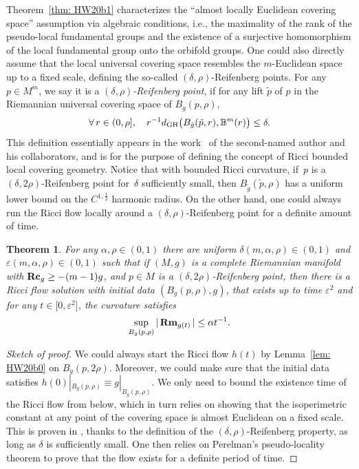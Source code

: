 \documentclass[10pt,a4paper]{amsart}
\numberwithin{equation}{section}
\newtheorem{Theorem}{Theorem}[section]
\newcommand{\Rm}{\operatorname{\bf Rm}}
\newcommand{\Rc}{\operatorname{\bf Rc}}
\begin{document}
Theorem~\ref{thm: HW20b1} characterizes the ``almost locally Euclidean
covering space'' assumption via algebraic conditions, i.e., the maximality of
the rank of the pseudo-local fundamental groups and the existence of a
surjective homomorphism of the local fundamental group onto the orbifold
groups. One could also directly assume that the local universal covering space
resembles the $m$-Euclidean space up to a fixed scale, defining the so-called
$(\delta,\rho)$-Reifenberg points. For any $p\in M^m$, we say it is a
$(\delta,\rho)$\emph{-Reifenberg point}, if for any lift $\tilde{p}$ of $p$ in
the Riemannian universal covering space of $B_g(p,\rho)$,
\begin{align*}
\forall\, r\in (0,\rho],\quad r^{-1}d_{\rm GH} \big(B_{\tilde{g}}(\tilde{p},r),
\mathbb{B}^m(r) \big) \le \delta.
\end{align*}
This definition essentially appears in the work~\cite{HKRX18} of the
second-named author and his collaborators, and is for the purpose of defining
the concept of Ricci bounded local covering geometry. Notice that with bounded
Ricci curvature, if~$p$ is a~$(\delta,2\rho)$-Reifenberg point for~$\delta$
sufficiently small, then $B_{\tilde{g}}(\tilde{p},\rho)$ has a uniform lower
bound on the $C^{1,\frac{1}{2}}$ harmonic radius. On the other hand, one could
always run the Ricci flow locally around a $(\delta,\rho)$-Reifenberg point for
a definite amount of time.
\begin{Theorem}\label{thm: HKRX18b}
For any $\alpha,\rho \in (0,1)$ there are uniform $\delta(m,\alpha,\rho) \in
(0,1)$ and $\varepsilon(m,\alpha,\rho)\in (0,1)$ such that if $(M,g)$ is a
complete Riemannian manifold with $\Rc_g\ge-(m-1)g$, and $p\in M$ is a
$(\delta,2\rho)$-Reifenberg point, then there is a Ricci flow solution with
initial data $(B_g(p,\rho),g)$, that exists up to time $\varepsilon^2$
and for any $t\in \big[0,\varepsilon^2\big]$, the curvature satisfies
\begin{align*}
\sup_{B_g(p,\rho)} |\Rm_{g(t)} | \le \alpha t^{-1}.
\end{align*}
\end{Theorem}
\begin{proof}[Sketch of proof]
We could always start the Ricci flow $h(t)$ by Lemma~\ref{lem: HW20b0} on
$B_g(p,2\rho)$. Moreover, we could make sure that the initial data satisfies
$h(0)|_{B_g(p,\rho)}\equiv g|_{B_g(p,\rho)}$. We only need to bound the
existence time of the Ricci flow from below, which in turn relies on showing
that the isoperimetric constant at any point of the covering space is almost
Euclidean on a fixed scale. This is proven in \cite{CM17}, thanks to the
definition of the $(\delta,\rho)$-Reifenberg property, as long as $\delta$ is
sufficiently small. One then relies on Perelman's pseudo-locality theorem to
prove that the flow exists for a definite period of time.
\end{proof}
\end{document}

